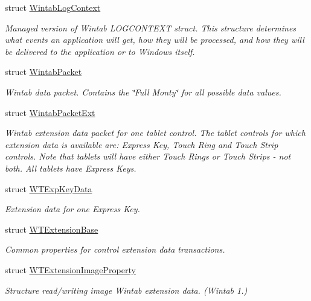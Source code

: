 \begin{DoxyCompactItemize}
struct \mbox{\hyperlink{struct_wintab_d_n_1_1_wintab_log_context}{Wintab\+Log\+Context}}
\begin{DoxyCompactList}\small\item\em Managed version of Wintab L\+O\+G\+C\+O\+N\+T\+E\+XT struct. This structure determines what events an application will get, how they will be processed, and how they will be delivered to the application or to Windows itself. \end{DoxyCompactList}\item 
struct \mbox{\hyperlink{struct_wintab_d_n_1_1_wintab_packet}{Wintab\+Packet}}
\begin{DoxyCompactList}\small\item\em Wintab data packet. Contains the \char`\"{}\+Full Monty\char`\"{} for all possible data values. \end{DoxyCompactList}\item 
struct \mbox{\hyperlink{struct_wintab_d_n_1_1_wintab_packet_ext}{Wintab\+Packet\+Ext}}
\begin{DoxyCompactList}\small\item\em Wintab extension data packet for one tablet control. The tablet controls for which extension data is available are\+: Express Key, Touch Ring and Touch Strip controls. Note that tablets will have either Touch Rings or Touch Strips -\/ not both. All tablets have Express Keys. \end{DoxyCompactList}\item 
struct \mbox{\hyperlink{struct_wintab_d_n_1_1_w_t_exp_key_data}{W\+T\+Exp\+Key\+Data}}
\begin{DoxyCompactList}\small\item\em Extension data for one Express Key. \end{DoxyCompactList}\item 
struct \mbox{\hyperlink{struct_wintab_d_n_1_1_w_t_extension_base}{W\+T\+Extension\+Base}}
\begin{DoxyCompactList}\small\item\em Common properties for control extension data transactions. \end{DoxyCompactList}\item 
struct \mbox{\hyperlink{struct_wintab_d_n_1_1_w_t_extension_image_property}{W\+T\+Extension\+Image\+Property}}
\begin{DoxyCompactList}\small\item\em Structure read/writing image Wintab extension data. (Wintab 1.) \end{DoxyCompactList}\item 

\end{DoxyCompactItemize}
